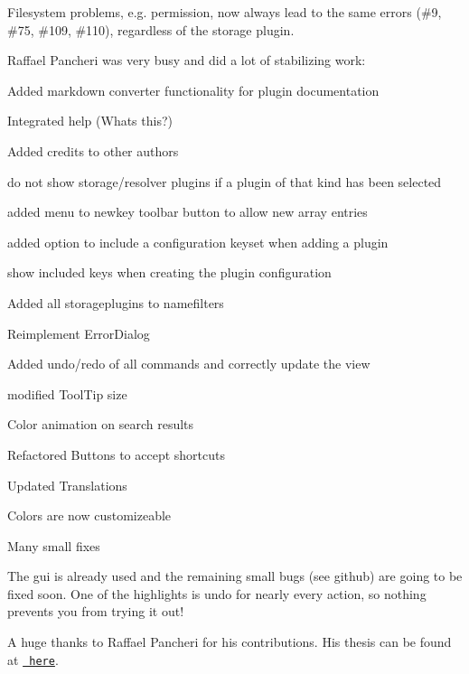 Filesystem problems, e.\+g. permission, now always lead to the same errors (\#9, \#75, \#109, \#110), regardless of the storage plugin.

Raffael Pancheri was very busy and did a lot of stabilizing work\+:


\begin{DoxyItemize}
\item Added markdown converter functionality for plugin documentation
\item Integrated help (Whats this?)
\item Added credits to other authors
\item do not show storage/resolver plugins if a plugin of that kind has been selected
\item added menu to newkey toolbar button to allow new array entries
\item added option to include a configuration keyset when adding a plugin
\item show included keys when creating the plugin configuration
\item Added all storageplugins to namefilters
\item Reimplement Error\+Dialog
\item Added undo/redo of all commands and correctly update the view
\item modified Tool\+Tip size
\item Color animation on search results
\item Refactored Buttons to accept shortcuts
\item Updated Translations
\item Colors are now customizeable
\item Many small fixes
\end{DoxyItemize}

The gui is already used and the remaining small bugs (see github) are going to be fixed soon. One of the highlights is undo for nearly every action, so nothing prevents you from trying it out!

A huge thanks to Raffael Pancheri for his contributions. His thesis can be found at \href{https://www.libelektra.org/ftp/elektra/pancheri2015gui.pdf}{\texttt{ here}}.


